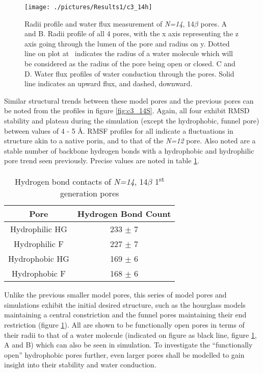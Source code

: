 \begin{figure}[H]
\begin{center}
\texttt{[image: ./pictures/Results1/c3\_14h]}
\caption[Radii profile and water flux measurement of \textit{N=14}, 14$\beta$ pores.] {Radii profile and water flux measurement of \textit{N=14}, 14$\beta$ pores. A and B. Radii profile of all 4 pores, with the x axis representing the z axis going through the lumen of the pore and radius on y. Dotted line on plot at  \angstrom\ indicates the radius of a water molecule which will be considered as the radius of the pore being open or closed. C and D. Water flux profiles of water conduction through the pores. Solid line indicates an upward flux, and dashed, downward.}
\label{fig:c3_14h}
\end{center}
\end{figure}

Similar structural trends between these model pores and the previous pores can be noted from the profiles in figure \ref{fig:c3_14S}. Again, all four exhibit RMSD stability and plateau during the simulation (except the hydrophobic, funnel pore) between values of 4 - 5 \AA. RMSF profiles for all indicate a fluctuations in structure akin to a native porin, and to that of the \textit{N=12} pore.  Also noted are a stable number of backbone hydrogen bonds with a hydrophobic and hydrophilic pore trend seen previously. Precise values are noted in table \ref{table:14hb}. 

\begin{table}[H]
\centering %
\begin{tabular}{ |c|c| } 
 \hline
  Pore & Hydrogen Bond Count \\  
  \hline
 Hydrophilic HG & 233 $\pm$ 7 \\ \hline
 Hydrophilic F & 227 $\pm$ 7 \\ \hline
 Hydrophobic HG & 169 $\pm$ 6 \\ \hline
 Hydrophobic F & 168 $\pm$ 6 \\
 \hline
 \end{tabular}
\caption{Hydrogen bond contacts of \textit{N=14}, 14$\beta$ 1\textsuperscript{st} generation pores} %
\label{table:14hb}
\end{table}

Unlike the previous smaller model pores, this series of model pores and simulations exhibit the initial desired structure, such as the hourglass models maintaining a central constriction and the funnel pores maintaining their end restriction (figure \ref{fig:c3_14h}). All are shown to be functionally open pores in terms of their radii to that of a water molecule (indicated on figure as black line, figure \ref{fig:c3_14h}, A and B) which can also be seen in simulation. To investigate the ``functionally open'' hydrophobic pores further, even larger pores shall be modelled to gain insight into their stability and water conduction. 

